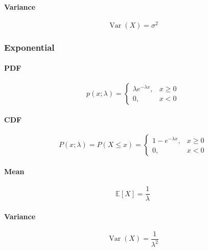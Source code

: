 \documentclass{article}
\begin{document}
\paragraph{Variance}
\label{para:prob-stat:dist:norm:variance}
\begin{equation}
    \label{eq:norm-variance}
    \operatorname{Var}(X) = \sigma^2
\end{equation}

\subsubsection{Exponential}
\label{subsubsec:prob-stat:dist:exp}

\paragraph{PDF}
\label{para:prob-stat:dist:exp:pdf}
\begin{equation}
    \label{eq:exp-pdf}
    p(x; \lambda) =
    \begin{cases}
        \lambda e^{-\lambda x}, & x \geq 0 \\
        0, & x < 0
    \end{cases}
\end{equation}

\paragraph{CDF}
\label{para:prob-stat:dist:exp:cdf}
\begin{equation}
    \label{eq:exp-cdf}
    P(x; \lambda) = P(X \leq x) =
    \begin{cases}
        1 - e^{-\lambda x}, & x \geq 0 \\
        0, & x < 0
    \end{cases}
\end{equation}

\paragraph{Mean}
\label{para:prob-stat:dist:exp:mean}
\begin{equation}
    \label{eq:exp-mean}
    \mathbb{E}[X] = \frac{1}{\lambda}
\end{equation}

\paragraph{Variance}
\label{para:prob-stat:dist:exp:variance}
\begin{equation}
    \label{eq:exp-variance}
    \operatorname{Var}(X) = \frac{1}{\lambda^2}
\end{equation}
\end{document}
